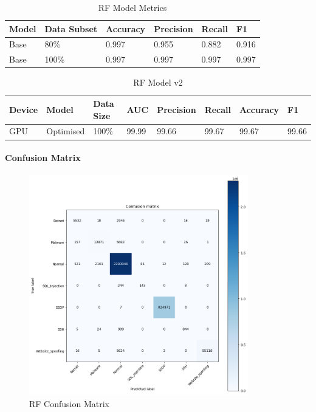 \begin{table}[h]
\centering
\caption{RF Model Metrics}
\label{tab:rf-metrics}
\begin{tabular}{|l|l|l|l|l|l|}
\hline
\textbf{Model} & \textbf{Data Subset} & \textbf{Accuracy} & \textbf{Precision} & \textbf{Recall} & \textbf{F1}  \\ \hline
Base & 80\% & 0.997 & 0.955 & 0.882 & 0.916  \\ \hline
Base & 100\% & 0.997 & 0.997 & 0.997 & 0.997 \\ \hline
\end{tabular}
\end{table}

\begin{table}[h]
\centering
\caption{RF Model v2}
\label{tab:rf-model2}
\begin{tabular}{|l|l|l|l|l|l|l|l|}
\hline
\textbf{Device} & \textbf{Model} & \textbf{Data Size} & \textbf{AUC} & \textbf{Precision} & \textbf{Recall} & \textbf{Accuracy} & \textbf{F1}  \\ \hline
GPU & Optimised & 100\% & 99.99 & 99.66 & 99.67 & 99.67 & 99.66 \\ \hline
\end{tabular}
\end{table}

\paragraph{Confusion Matrix}

\begin{figure}[H]
    \centering
    \includegraphics[width=0.85\textwidth]{Appendices/NN Confusion Matrix 3-04-23.png}
    \caption{RF Confusion Matrix}
    \label{fig:rf_confusion_matrix}
\end{figure}
